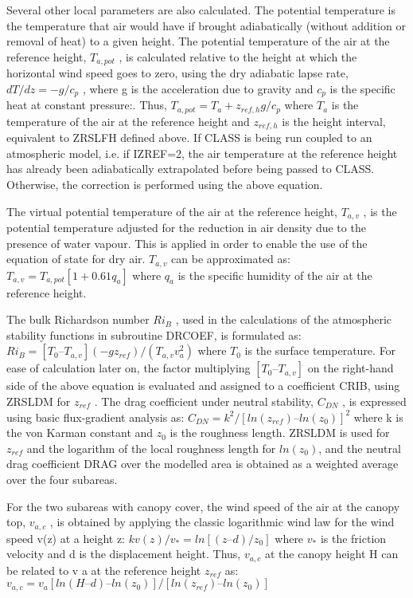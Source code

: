 Several other local parameters are also calculated. The potential temperature is the temperature that air would have if brought adiabatically (without addition or removal of heat) to a given height. The potential temperature of the air at the reference height, $T_{a,pot}$ , is calculated relative to the height at which the horizontal wind speed goes to zero, using the dry adiabatic lapse rate, $dT/dz = -g/c_p$ , where g is the acceleration due to gravity and $c_p$ is the specific heat at constant pressure\+:. Thus, $T_{a,pot} = T_a + z_{ref,h} g/c_p$ where $T_a$ is the temperature of the air at the reference height and $z_{ref,h}$ is the height interval, equivalent to Z\+R\+S\+L\+F\+H defined above. If C\+L\+A\+S\+S is being run coupled to an atmospheric model, i.\+e. if I\+Z\+R\+E\+F=2, the air temperature at the reference height has already been adiabatically extrapolated before being passed to C\+L\+A\+S\+S. Otherwise, the correction is performed using the above equation.

The virtual potential temperature of the air at the reference height, $T_{a,v}$ , is the potential temperature adjusted for the reduction in air density due to the presence of water vapour. This is applied in order to enable the use of the equation of state for dry air. $T_{a,v}$ can be approximated as\+: $T_{a,v} = T_{a,pot} [1 + 0.61 q_a ]$ where $q_a$ is the specific humidity of the air at the reference height.

The bulk Richardson number $Ri_B$ , used in the calculations of the atmospheric stability functions in subroutine D\+R\+C\+O\+E\+F, is formulated as\+: $Ri_B = [T_0 – T_{a,v} ] (-g z_{ref} )/(T_{a,v} v_a^2 )$ where $T_0$ is the surface temperature. For ease of calculation later on, the factor multiplying $[T_0 – T_{a,v} ]$ on the right-\/hand side of the above equation is evaluated and assigned to a coefficient C\+R\+I\+B, using Z\+R\+S\+L\+D\+M for $z_{ref}$ . The drag coefficient under neutral stability, $C_{DN}$ , is expressed using basic flux-\/gradient analysis as\+: $C_{DN} = k^2 /[ln(z_{ref} ) – ln(z_0 )]^2$ where k is the von Karman constant and $z_0$ is the roughness length. Z\+R\+S\+L\+D\+M is used for $z_{ref}$ and the logarithm of the local roughness length for $ln(z_0 )$, and the neutral drag coefficient D\+R\+A\+G over the modelled area is obtained as a weighted average over the four subareas.

For the two subareas with canopy cover, the wind speed of the air at the canopy top, $v_{a,c}$ , is obtained by applying the classic logarithmic wind law for the wind speed v(z) at a height z\+: $kv(z)/v_* = ln[(z – d)/z_0 ]$ where $v_*$ is the friction velocity and d is the displacement height. Thus, $v_{a,c}$ at the canopy height H can be related to v a at the reference height $z_{ref}$ as\+: $v_{a,c} = v_a [ln(H – d) – ln(z_0 )]/[ln(z_{ref} ) – ln(z_0 )]$


